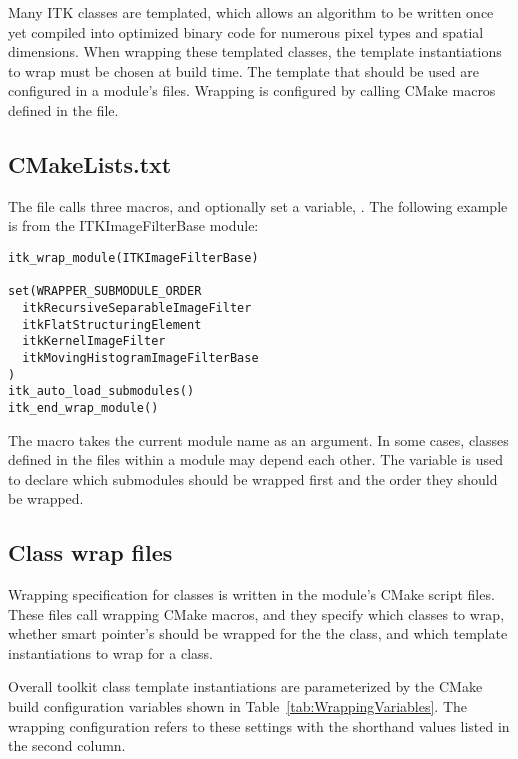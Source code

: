 Many ITK classes are templated, which allows an algorithm to be written once
yet compiled into optimized binary code for numerous pixel types and
spatial dimensions. When wrapping these templated classes, the template
instantiations to wrap must be chosen at build time. The template
that should be used are configured in a module's  files.
Wrapping is configured by calling CMake macros defined in the
 file.


\subsection{CMakeLists.txt}

The  file calls three macros, and
optionally set a variable, . The following
example is from the ITKImageFilterBase module:

\begin{verbatim}
itk_wrap_module(ITKImageFilterBase)

set(WRAPPER_SUBMODULE_ORDER
  itkRecursiveSeparableImageFilter
  itkFlatStructuringElement
  itkKernelImageFilter
  itkMovingHistogramImageFilterBase
)
itk_auto_load_submodules()
itk_end_wrap_module()
\end{verbatim}

The  macro takes the current module name as an argument. In
some cases, classes defined in the  files within a module may depend
each other. The  variable is used to declare
which submodules should be wrapped first and the order they should be
wrapped.


\subsection{Class wrap files}
\label{subsec:ClassWrapFiles}

Wrapping specification for classes is written in the module's 
CMake script files. These files call wrapping CMake macros, and they specify
which classes to wrap, whether smart pointer's should be wrapped for the the
class, and which template instantiations to wrap for a class.

Overall toolkit class template instantiations are parameterized by the CMake
build configuration variables shown in Table~\ref{tab:WrappingVariables}.
The wrapping configuration refers to these settings with the shorthand values
listed in the second column.


